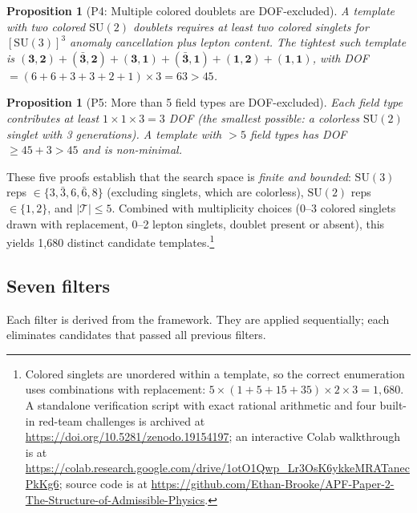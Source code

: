 \documentclass[11pt,a4paper]{article}
\newtheorem{proposition}[theorem]{Proposition}
\theoremstyle{definition}
\newcommand{\SU}{\mathrm{SU}}
\begin{document}
\begin{proposition}[P4: Multiple colored doublets are DOF-excluded]
\label{prop:P4}
A template with two colored $\SU(2)$ doublets requires at least two
colored singlets for $[\SU(3)]^3$ anomaly cancellation plus lepton content.
The tightest such template is
$(\mathbf{3},\mathbf{2}) + (\bar{\mathbf{3}},\mathbf{2}) +
(\mathbf{3},\mathbf{1}) + (\bar{\mathbf{3}},\mathbf{1}) +
(\mathbf{1},\mathbf{2}) + (\mathbf{1},\mathbf{1})$, with
DOF $= (6 + 6 + 3 + 3 + 2 + 1) \times 3 = 63 > 45$.
\end{proposition}

\begin{proposition}[P5: More than 5 field types are DOF-excluded]
\label{prop:P5}
Each field type contributes at least $1 \times 1 \times 3 = 3$ DOF
(the smallest possible: a colorless $\SU(2)$ singlet with 3 generations).
A template with $> 5$ field types has DOF $\ge 45 + 3 > 45$ and is
non-minimal.
\end{proposition}

\noindent These five proofs establish that the search space is
\emph{finite and bounded}: $\SU(3)$ reps $\in \{3, \bar{3}, 6,
\bar{6}, 8\}$ (excluding singlets, which are colorless),
$\SU(2)$ reps $\in \{1, 2\}$, and $|\mathcal{T}| \le 5$.
Combined with multiplicity choices (0--3 colored singlets drawn
with replacement, 0--2 lepton singlets, doublet present or absent),
this yields 1{,}680 distinct candidate templates.\footnote{Colored
singlets are unordered within a template, so the correct enumeration
uses combinations with replacement: $5 \times (1 + 5 + 15 + 35)
\times 2 \times 3 = 1{,}680$.  A standalone verification script
with exact rational arithmetic and four built-in red-team challenges
is archived at \url{https://doi.org/10.5281/zenodo.19154197}; an
interactive Colab walkthrough is at
\url{https://colab.research.google.com/drive/1otO1Qwp_Lr3OsK6ykkeMRATanecPkKg6};
source code is at
\url{https://github.com/Ethan-Brooke/APF-Paper-2-The-Structure-of-Admissible-Physics}.}


\subsection{Seven filters}
\label{sec:seven_filters}

Each filter is derived from the framework.  They are applied
sequentially; each eliminates candidates that passed all previous
filters.
\end{document}
